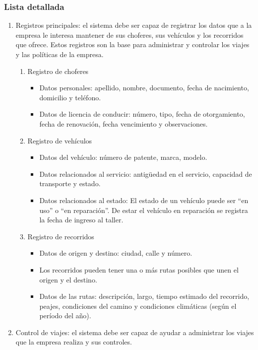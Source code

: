 \subsubsection{Lista detallada}
\begin{enumerate}
\item Registros principales: el sistema debe ser capaz de registrar los datos que a la empresa le interesa mantener de sus choferes,
  sus veh\'iculos y los recorridos que ofrece. Estos registros son la base para administrar y controlar los viajes y las pol\'iticas de la empresa.
  \begin{enumerate}[label=\Roman{*}]
  \item Registro de choferes
    \begin{itemize}
      \item Datos personales: apellido, nombre, documento, fecha de nacimiento, domicilio y tel\'efono.
      \item Datos de licencia de conducir: n\'umero, tipo, fecha de otorgamiento, fecha de renovaci\'on, fecha vencimiento y observaciones.
    \end{itemize}
  \item Registro de veh\'iculos
    \begin{itemize}
      \item Datos del veh\'iculo: n\'umero de patente, marca, modelo.
      \item Datos relacionados al servicio: antig\"{u}edad en el servicio, capacidad de transporte y estado.
      \item Datos relacionados al estado: El estado de un veh\'iculo puede ser ``en uso'' o ``en reparaci\'on''. 
      De estar el veh\'iculo en reparaci\'on se registra la fecha de ingreso al taller.
    \end{itemize}
  \item Registro de recorridos
    \begin{itemize}
      \item Datos de origen y destino: ciudad, calle y n\'umero.
      \item Los recorridos pueden tener una o m\'as rutas posibles que unen el origen y el destino.
      \item Datos de las rutas: descripci\'on, largo, tiempo estimado del recorrido, peajes, condiciones
      del camino y condiciones clim\'aticas (seg\'un el per\'iodo del a\~no).
    \end{itemize}  
  \end{enumerate}
\item Control de viajes: el sistema debe ser capaz de ayudar a administrar los viajes que la empresa realiza y sus controles.

\end{enumerate}
